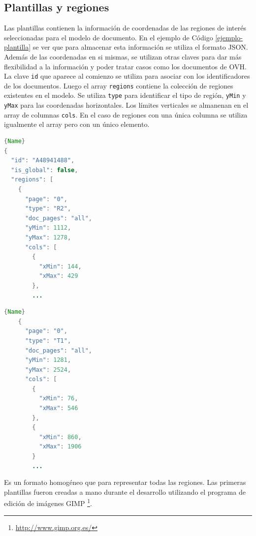 \subsection{Plantillas y regiones}


Las plantillas contienen la información de coordenadas de las regiones de interés seleccionadas para el modelo de documento. En el ejemplo de Código \ref{ejemplo-plantilla} se ver que para almacenar esta información se utiliza el formato JSON. Además de las coordenadas en si mismas, se utilizan otras claves para dar más flexibilidad a la información y poder tratar casos como los documentos de OVH. La clave \verb|id| que aparece al comienzo se utiliza para asociar con los identificadores de los documentos. Luego el array \verb|regions| contiene la colección de regiones existentes en el modelo. Se utiliza \verb|type| para identificar el tipo de región, \verb|yMin| y \verb|yMax| para las coordenadas horizontales. Los límites verticales se almanenan en el array de columnas \verb|cols|. En el caso de regiones con una única columna se utiliza igualmente el array pero con un único elemento.

\noindent\begin{minipage}{.45\textwidth}
    \begin{lstlisting}[language=Java,caption=Comienzo de la plantilla.,frame=tlrb]{Name}
{
  "id": "A48941488",
  "is_global": false,
  "regions": [
    {
      "page": "0",
      "type": "R2",
      "doc_pages": "all",
      "yMin": 1112,
      "yMax": 1278,
      "cols": [
        {
          "xMin": 144,
          "xMax": 429
        },
        ...
    \end{lstlisting}
\end{minipage}\hfill
\begin{minipage}{.45\textwidth}
    \begin{lstlisting}[language=Java,caption=Región T1.,frame=tlrb]{Name}
    {
      "page": "0",
      "type": "T1",
      "doc_pages": "all",
      "yMin": 1281,
      "yMax": 2524,
      "cols": [
        {
          "xMin": 76,
          "xMax": 546
        },
        {
          "xMin": 860,
          "xMax": 1906
        }
        ...
    \end{lstlisting}
\end{minipage}

Es un formato homogéneo que para representar todas las regiones. Las primeras plantillas fueron creadas a mano durante el desarrollo utilizando el programa de edición de imágenes GIMP \footnote{\url{http://www.gimp.org.es/}}.

